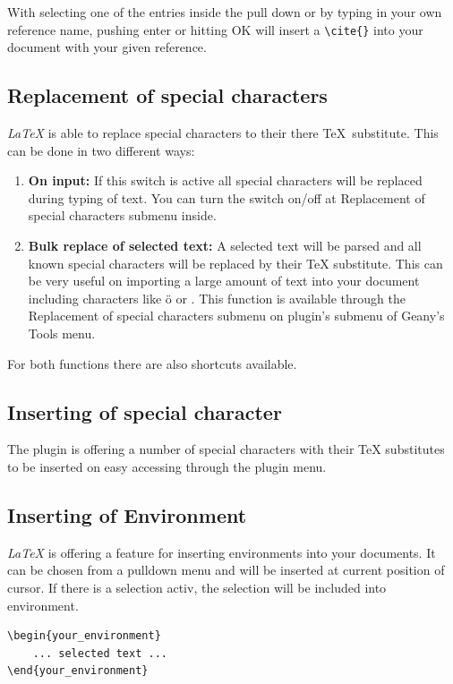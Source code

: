 \documentclass[%
paper=a4,%
fontsize=11pt,%
twoside=false,%
DIV18,%
headsepline,%
plainheadsepline,%
footsepline,%
plainfootsepline,%
bibliography=totoc,%
listof=totoc,%
BCOR10mm,%
parskip=half,%
openany,%
]{scrartcl}
\begin{document}
With selecting one of the entries inside the pull down or by typing
in your own reference name, pushing enter or hitting OK will insert
a \texttt{\textbackslash{}cite\{\}} into your document with your
given reference.

\subsection{Replacement of special characters}
\textit{LaTeX} is able to replace special characters to their there \TeX\
substitute. This can be done in two different ways:

\begin{enumerate}
	\item \textbf{On input:} If this switch is active all special
		  characters will be replaced during typing of text. You can
		  turn the switch on/off at Replacement of special characters
		  submenu inside.
	\item \textbf{Bulk replace of selected text:}
		  A selected text will be parsed and all known special characters
		  will be replaced by their \TeX{} substitute. This can be very useful
		  on importing a large amount of text into your document
		  including characters like ö or \frqq. This function is
		  available through the Replacement of special characters
		  submenu on plugin's submenu of Geany's Tools menu.
\end{enumerate}

For both functions there are also shortcuts available.

\subsection{Inserting of special character}
The plugin is offering a number of special characters with their \TeX{}
substitutes to be inserted on easy accessing through the plugin menu.

\subsection{Inserting of Environment}
\textit{LaTeX} is offering a feature for inserting environments into your
documents. It can be chosen from a pulldown menu and will be inserted at
current position of cursor. If there is a selection activ, the selection
will be included into environment.

\begin{lstlisting}
\begin{your_environment}
	... selected text ...
\end{your_environment}
\end{lstlisting}
\end{document}
